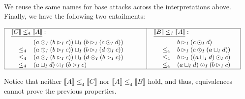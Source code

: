 \documentclass{llncs}
\newcommand{\interp}[1]{\llbracket #1 \rrbracket}
\newcommand{\ATermsnt}[1]{\mathit{#1}}
\begin{document}
\begin{example}
\begin{center}
\begin{math}
  \end{math}
\end{center}
We reuse the same names for base attacks across the interpretations
above.  Finally, we have the following two entailments:
\begin{center}
  \begin{math}
    \footnotesize
    \begin{array}{|ll|l|}
      \hline
      \begin{array}{lll}
        \underline{\interp{C} \leq_4 \interp{A}}:\\[4px]
        \,\,\,\,\begin{array}{rl}
               & (a \odot_I (b \rhd_I c)) \sqcup_I (b \rhd_I (c \odot_I d))\\
        \leq_4 &  (a \odot_I (b \rhd_I c)) \sqcup_I (b \rhd_I (d \odot_I c))\\
        \leq_4 &  (a \odot_I (b \rhd_I c)) \sqcup_I (d \odot_I (b \rhd_I c))\\
        \leq_4 &  (a \sqcup_I d) \odot_I (b \rhd_I c)\\
        \end{array}
      \end{array}
      & \quad &
      \begin{array}{lll}
        \underline{\interp{B} \leq_I \interp{A}}:\\[4px]
        \,\,\,\,\,\begin{array}{lll}
               & b \rhd_I (c \odot_I d)\\
        \leq_4 &  b \rhd_I (c \odot_I (a \sqcup_I d))\\
        \leq_4 &  b \rhd_I ((a \sqcup_I d) \odot_I c)\\
        \leq_4 & (a \sqcup_I d) \odot_I (b \rhd_I c)\\
        \end{array}
      \end{array}\\
      \hline
    \end{array}
  \end{math}
\end{center}
Notice that neither $\interp{\ATermsnt{A}} \leq_4 \interp{\ATermsnt{C}}$ nor
$\interp{\ATermsnt{A}} \leq_4 \interp{\ATermsnt{B}}$ hold, and thus, equivalences
cannot prove the previous properties.
\end{example}


\end{document}

